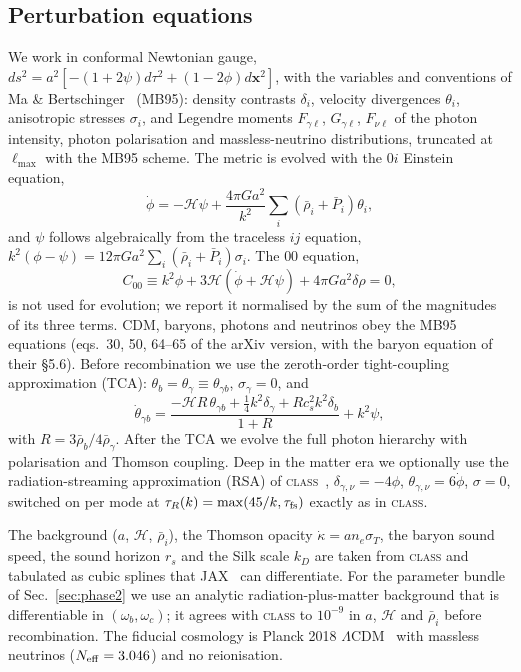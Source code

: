 \documentclass[prd,twocolumn,superscriptaddress,nofootinbib,floatfix]{revtex4-2}
\newcommand{\kd}{\dot\kappa}
\newcommand{\Hc}{\mathcal{H}}
\begin{document}
\subsection{Perturbation equations}
We work in conformal Newtonian gauge, $ds^2=a^2[-(1+2\psi)d\tau^2+(1-2\phi)d\mathbf{x}^2]$, with the variables and conventions of Ma \& Bertschinger~\cite{MaBertschinger1995} (MB95): density contrasts $\delta_i$, velocity divergences $\theta_i$, anisotropic stresses $\sigma_i$, and Legendre moments $F_{\gamma\ell}$, $G_{\gamma\ell}$, $F_{\nu\ell}$ of the photon intensity, photon polarisation and massless-neutrino distributions, truncated at $\ell_{\max}$ with the MB95 scheme. The metric is evolved with the $0i$ Einstein equation,
\begin{equation}
\dot\phi = -\Hc\psi + \frac{4\pi G a^2}{k^2}\sum_i(\bar\rho_i+\bar P_i)\theta_i ,\label{eq:phidot}
\end{equation}
and $\psi$ follows algebraically from the traceless $ij$ equation, $k^2(\phi-\psi)=12\pi G a^2\sum_i(\bar\rho_i+\bar P_i)\sigma_i$. The $00$ equation,
\begin{equation}
C_{00}\equiv k^2\phi+3\Hc(\dot\phi+\Hc\psi)+4\pi G a^2\delta\rho = 0 ,\label{eq:c00}
\end{equation}
is not used for evolution; we report it normalised by the sum of the magnitudes of its three terms. CDM, baryons, photons and neutrinos obey the MB95 equations (eqs.~30, 50, 64--65 of the arXiv version, with the baryon equation of their \S5.6). Before recombination we use the zeroth-order tight-coupling approximation (TCA): $\theta_b=\theta_\gamma\equiv\theta_{\gamma b}$, $\sigma_\gamma=0$, and
\begin{equation}
\dot\theta_{\gamma b}=\frac{-\Hc R\,\theta_{\gamma b}+\tfrac14 k^2\delta_\gamma+R c_s^2k^2\delta_b}{1+R}+k^2\psi ,
\end{equation}
with $R=3\bar\rho_b/4\bar\rho_\gamma$. After the TCA we evolve the full photon hierarchy with polarisation and Thomson coupling. Deep in the matter era we optionally use the radiation-streaming approximation (RSA) of \textsc{class}~\cite{CLASS2}, $\delta_{\gamma,\nu}=-4\phi$, $\theta_{\gamma,\nu}=6\dot\phi$, $\sigma=0$, switched on per mode at $\tau_R(k)=\max(45/k,\tau_{\rm fs})$ exactly as in \textsc{class}.

The background ($a$, $\Hc$, $\bar\rho_i$), the Thomson opacity $\kd=an_e\sigma_T$, the baryon sound speed, the sound horizon $r_s$ and the Silk scale $k_D$ are taken from \textsc{class} and tabulated as cubic splines that JAX~\cite{JAX} can differentiate. For the parameter bundle of Sec.~\ref{sec:phase2} we use an analytic radiation-plus-matter background that is differentiable in $(\omega_b,\omega_c)$; it agrees with \textsc{class} to $10^{-9}$ in $a$, $\Hc$ and $\bar\rho_i$ before recombination. The fiducial cosmology is Planck 2018 $\Lambda$CDM~\cite{Planck2018} with massless neutrinos ($N_{\rm eff}=3.046$) and no reionisation.
\end{document}
